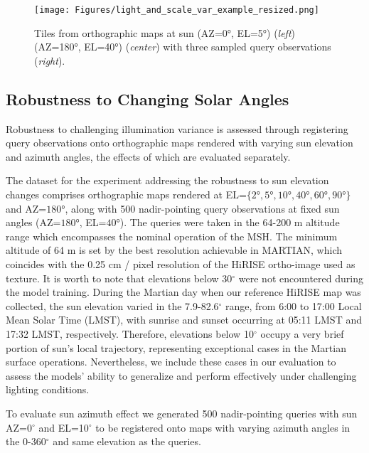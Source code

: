 \begin{figure}
    \centering
     \centering
        \texttt{[image: Figures/light\_and\_scale\_var\_example\_resized.png]}
    \vspace{-10pt}
    \caption{\label{fig:test_samples}Tiles from orthographic maps at sun (AZ=0°, EL=5°) (\textit{left}) (AZ=180°, EL=40°) (\textit{center}) with three sampled query observations (\textit{right}).}
\end{figure}


\subsection{Robustness to Changing Solar Angles}
\label{subsec:mbl_robustnbess_to_az_and_el}
Robustness to challenging illumination variance is assessed through registering  query observations onto orthographic maps rendered with varying sun elevation and azimuth angles, the effects of which are evaluated separately. 

The dataset for the experiment addressing the robustness to sun elevation changes comprises orthographic maps rendered at EL=$\{2°, 5°, 10°, 40°, 60°, 90°\}$ and AZ=$180°$, along with 500 nadir-pointing query observations at fixed sun angles (AZ=$180°$, EL=$40°$). The queries were taken in the 64-200 m altitude range which encompasses the nominal operation of the MSH. The minimum altitude of 64 m is set by the best resolution achievable in MARTIAN, which coincides with the 0.25 cm / pixel resolution of the HiRISE ortho-image used as texture. It is worth to note that elevations below 30$^{\circ}$ were not encountered during the model training. During the Martian day when our reference HiRISE map was collected, the sun elevation varied in the 7.9-82.6$^{\circ}$ range,  from 6:00 to 17:00 Local Mean Solar Time (LMST), with sunrise and sunset occurring at 05:11 LMST and 17:32 LMST, respectively. Therefore, elevations below 10$^{\circ}$ occupy a very brief portion of sun's local trajectory, representing exceptional cases in the Martian surface operations. Nevertheless, we include these cases in our evaluation to assess the models' ability to generalize and perform effectively under challenging lighting conditions.

To evaluate sun azimuth effect we generated 500 nadir-pointing queries with sun AZ=0$^{\circ}$ and EL=10$^{\circ}$ to be registered onto maps with varying azimuth angles in the 0-360$^{\circ}$ and same elevation as the queries.\\


